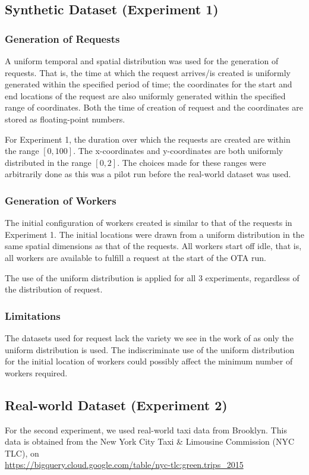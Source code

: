 \documentclass[urop]{socreport}
\begin{document}
\subsection{Synthetic Dataset (Experiment 1)}
\label{sec:exp1data}
\subsubsection{Generation of Requests}
A uniform temporal and spatial distribution was used for the generation of requests. That is, the time at which the request arrives/is created is uniformly generated within the specified period of time; the coordinates for the start and end locations of the request are also uniformly generated within the specified range of coordinates. Both the time of creation of request and the coordinates are stored as floating-point numbers. 

For Experiment 1, the duration over which the requests are created are within the range $[0, 100]$. The x-coordinates and y-coordinates are both uniformly distributed in the range $[0, 2]$. The choices made for these ranges were arbitrarily done as this was a pilot run before the real-world dataset was used.

\subsubsection{Generation of Workers}
The initial configuration of workers created is similar to that of the requests in Experiment 1. The initial locations were drawn from a uniform distribution in the same spatial dimensions as that of the requests. All workers start off idle, that is, all workers are available to fulfill a request at the start of the OTA run.

The use of the uniform distribution is applied for all 3 experiments, regardless of the distribution of request. 

\subsubsection{Limitations}
The datasets used for request lack the variety we see in the work of \cite{Tong} as only the uniform distribution is used. The indiscriminate use of the uniform distribution for the initial location of workers could possibly affect the minimum number of workers required. 

\subsection{Real-world Dataset (Experiment 2)}
\label{sec:exp2data}
For the second experiment, we used real-world taxi data from Brooklyn. This data is obtained from the New York City Taxi & Limousine Commission (NYC TLC), on \\ \url{https://bigquery.cloud.google.com/table/nyc-tlc:green.trips_2015}
\end{document}
